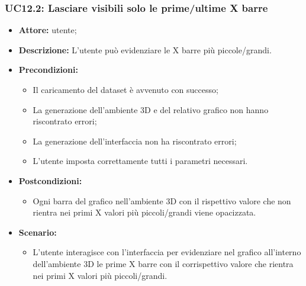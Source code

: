 \subsubsection{UC12.2: Lasciare visibili solo le prime/ultime X barre}
\begin{itemize}    
    \item \textbf{Attore:} utente;
    \item \textbf{Descrizione:} L'utente può evidenziare le X barre più piccole/grandi.
    \item \textbf{Precondizioni:}    
        \begin{itemize}
            \item Il caricamento del dataset è avvenuto con successo;
            \item La generazione dell'ambiente 3D e del relativo grafico non hanno riscontrato errori;
            \item La generazione dell'interfaccia non ha riscontrato errori;
            \item L'utente imposta correttamente tutti i parametri necessari.
        \end{itemize}    
    \item \textbf{Postcondizioni:}
        \begin{itemize}
            \item Ogni barra del grafico nell'ambiente 3D con il rispettivo valore che non rientra nei primi X valori più piccoli/grandi viene opacizzata.
        \end{itemize}    
    \item \textbf{Scenario:} 
        \begin{itemize}
            \item L'utente interagisce con l'interfaccia per evidenziare nel grafico all'interno dell'ambiente 3D le prime X barre con il corrispettivo valore che rientra nei primi X valori più piccoli/grandi.
        \end{itemize}
\end{itemize}
